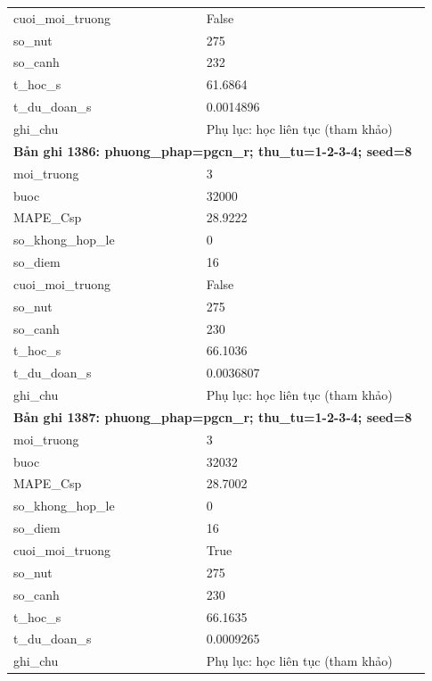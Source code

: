 \begin{longtable}{p{0.43\linewidth}p{0.50\linewidth}}
cuoi\_\allowbreak moi\_\allowbreak truong & False \\
so\_\allowbreak nut & 275 \\
so\_\allowbreak canh & 232 \\
t\_\allowbreak hoc\_\allowbreak s & 61.6864 \\
t\_\allowbreak du\_\allowbreak doan\_\allowbreak s & 0.0014896 \\
ghi\_\allowbreak chu & Phụ lục: học liên tục (tham khảo) \\
\midrule
\multicolumn{2}{p{0.95\linewidth}}{\textbf{Bản ghi 1386: phuong\_phap=pgcn\_r; thu\_tu=1-2-3-4; seed=8}} \\
moi\_\allowbreak truong & 3 \\
buoc & 32000 \\
MAPE\_\allowbreak Csp & 28.9222 \\
so\_\allowbreak khong\_\allowbreak hop\_\allowbreak le & 0 \\
so\_\allowbreak diem & 16 \\
cuoi\_\allowbreak moi\_\allowbreak truong & False \\
so\_\allowbreak nut & 275 \\
so\_\allowbreak canh & 230 \\
t\_\allowbreak hoc\_\allowbreak s & 66.1036 \\
t\_\allowbreak du\_\allowbreak doan\_\allowbreak s & 0.0036807 \\
ghi\_\allowbreak chu & Phụ lục: học liên tục (tham khảo) \\
\midrule
\multicolumn{2}{p{0.95\linewidth}}{\textbf{Bản ghi 1387: phuong\_phap=pgcn\_r; thu\_tu=1-2-3-4; seed=8}} \\
moi\_\allowbreak truong & 3 \\
buoc & 32032 \\
MAPE\_\allowbreak Csp & 28.7002 \\
so\_\allowbreak khong\_\allowbreak hop\_\allowbreak le & 0 \\
so\_\allowbreak diem & 16 \\
cuoi\_\allowbreak moi\_\allowbreak truong & True \\
so\_\allowbreak nut & 275 \\
so\_\allowbreak canh & 230 \\
t\_\allowbreak hoc\_\allowbreak s & 66.1635 \\
t\_\allowbreak du\_\allowbreak doan\_\allowbreak s & 0.0009265 \\
ghi\_\allowbreak chu & Phụ lục: học liên tục (tham khảo) \\

\end{longtable}
